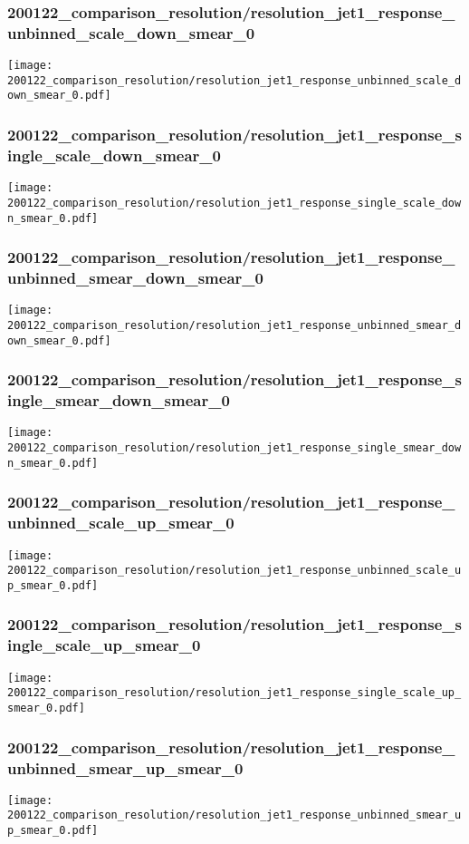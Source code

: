 \begin{frame}
   \frametitle{\small 200122\_comparison\_resolution/resolution\_jet1\_response\_unbinned\_scale\_down\_smear\_0}
   \centering
   \texttt{[image: 200122\_comparison\_resolution/resolution\_jet1\_response\_unbinned\_scale\_down\_smear\_0.pdf]}
\end{frame}

\begin{frame}
   \frametitle{\small 200122\_comparison\_resolution/resolution\_jet1\_response\_single\_scale\_down\_smear\_0}
   \centering
   \texttt{[image: 200122\_comparison\_resolution/resolution\_jet1\_response\_single\_scale\_down\_smear\_0.pdf]}
\end{frame}

\begin{frame}
   \frametitle{\small 200122\_comparison\_resolution/resolution\_jet1\_response\_unbinned\_smear\_down\_smear\_0}
   \centering
   \texttt{[image: 200122\_comparison\_resolution/resolution\_jet1\_response\_unbinned\_smear\_down\_smear\_0.pdf]}
\end{frame}

\begin{frame}
   \frametitle{\small 200122\_comparison\_resolution/resolution\_jet1\_response\_single\_smear\_down\_smear\_0}
   \centering
   \texttt{[image: 200122\_comparison\_resolution/resolution\_jet1\_response\_single\_smear\_down\_smear\_0.pdf]}
\end{frame}

\begin{frame}
   \frametitle{\small 200122\_comparison\_resolution/resolution\_jet1\_response\_unbinned\_scale\_up\_smear\_0}
   \centering
   \texttt{[image: 200122\_comparison\_resolution/resolution\_jet1\_response\_unbinned\_scale\_up\_smear\_0.pdf]}
\end{frame}

\begin{frame}
   \frametitle{\small 200122\_comparison\_resolution/resolution\_jet1\_response\_single\_scale\_up\_smear\_0}
   \centering
   \texttt{[image: 200122\_comparison\_resolution/resolution\_jet1\_response\_single\_scale\_up\_smear\_0.pdf]}
\end{frame}

\begin{frame}
   \frametitle{\small 200122\_comparison\_resolution/resolution\_jet1\_response\_unbinned\_smear\_up\_smear\_0}
   \centering
   \texttt{[image: 200122\_comparison\_resolution/resolution\_jet1\_response\_unbinned\_smear\_up\_smear\_0.pdf]}
\end{frame}

